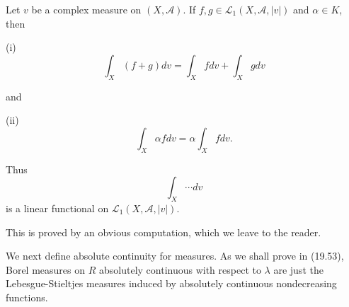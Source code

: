 Let $v$ be a complex measure on $(X, \mathcal{A})$. If $f, g \in \mathcal{L}_1(X, \mathcal{A}, |v|)$ and $\alpha \in K$, then

(i) $$\int_X (f + g) dv = \int_X f dv + \int_X g dv$$

and

(ii) $$\int_X \alpha f dv = \alpha \int_X f dv.$$

Thus $$\int_X \cdots dv$$ is a linear functional on $\mathcal{L}_1(X, \mathcal{A}, |v|)$.

This is proved by an obvious computation, which we leave to the reader.

We next define absolute continuity for measures. As we shall prove in (19.53), Borel measures on $R$ absolutely continuous with respect to $\lambda$ are just the Lebesgue-Stieltjes measures induced by absolutely continuous nondecreasing functions.